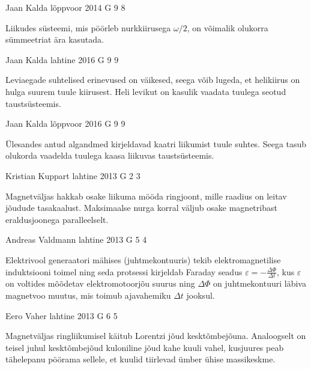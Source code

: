 \documentclass[11pt]{article}
\begin{document}
{%
{Jaan Kalda} %
{lõppvoor} %
{2014} %
{G 9} %
{8} %
{

\ifHint
Liikudes süsteemi, mis pöörleb nurkkiirusega $\omega/2$, on võimalik olukorra sümmeetriat ära kasutada.
\fi
}

{Jaan Kalda} %
{lahtine} %
{2016} %
{G 9} %
{9} %
{

\ifHint
Leviaegade suhtelised erinevused on väikesed, seega võib lugeda, et helikiirus on hulga suurem tuule kiirusest. Heli levikut on kasulik vaadata tuulega seotud taustsüsteemis.
\fi
}

{Jaan Kalda} %
{lõppvoor} %
{2016} %
{G 9} %
{9} %
{

\ifHint
Ülesandes antud algandmed kirjeldavad kaatri liikumist tuule suhtes. Seega tasub olukorda vaadelda tuulega kaasa liikuvas taustsüsteemis.
\fi
}

{Kristian Kuppart} %
{lahtine} %
{2013} %
{G 2} %
{3} %
{

\ifHint
Magnetväljas hakkab osake liikuma mööda ringjoont, mille raadius on leitav jõudude tasakaalust. Maksimaalse nurga korral väljub osake magnetribast eraldusjoonega paralleelselt.
\fi
}

{Andreas Valdmann} %
{lahtine} %
{2013} %
{G 5} %
{4} %
{

\ifHint
Elektrivool generaatori mähises (juhtmekontuuris) tekib elektromagnetilise induktsiooni toimel ning seda protsessi kirjeldab Faraday seadus $\varepsilon = -\frac{\Delta\Phi}{\Delta t}$, kus $\varepsilon$ on voltides mõõdetav elektromotoorjõu suurus ning $\Delta\Phi$ on juhtmekontuuri läbiva magnetvoo muutus, mis toimub ajavahemiku $\Delta t$ jooksul.
\fi
}

{Eero Vaher} %
{lahtine} %
{2013} %
{G 6} %
{5} %
{

\ifHint
Magnetväljas ringliikumisel käitub Lorentzi jõud kesktõmbejõuna. Analoogselt on teisel juhul kesktõmbejõud kuloniline jõud kahe kuuli vahel, kusjuures peab tähelepanu pöörama sellele, et kuulid tiirlevad ümber ühise massikeskme.
\fi
}

}
\end{document}
